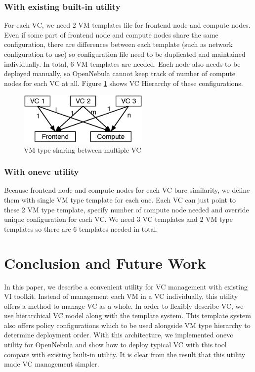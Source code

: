 \documentclass[conference]{IEEEtran}
\begin{document}
\subsubsection{With existing built-in utility}
For each VC, we need 2 VM templates file for frontend node and compute nodes.
Even if some part of frontend node and compute nodes share the same configuration, there are differences between each template (such as network configuration to use) so configuration file need to be duplicated and maintained individually.
In total, 6 VM templates are needed.
Each node also needs to be deployed manually, so OpenNebula cannot keep track of number of compute nodes for each VC at all.
Figure \ref{fig:vmtypeshare} shows VC Hierarchy of these configurations.

\begin{figure}[!t]
\centering
\includegraphics[width=2.5in]{vmtypeshare}
\caption{VM type sharing between multiple VC}
\label{fig:vmtypeshare}
\end{figure}

\subsubsection{With onevc utility}
Because frontend node and compute nodes for each VC bare similarity, we define them with single VM type template for each one.
Each VC can just point to these 2 VM type template, specify number of compute node needed and override unique configuration for each VC.
We need 3 VC templates and 2 VM type templates so there are 6 templates needed in total.

\section{Conclusion and Future Work}
In this paper, we describe a convenient utility for VC management with existing VI toolkit.
Instead of management each VM in a VC individually, this utility offers a method to manage VC as a whole.
In order to flexibly describe VC, we use hierarchical VC model along with the template system.
This template system also offers policy configurations which to be used alongside VM type hierarchy to determine deployment order.
With this architecture, we implemented onevc utility for OpenNebula and show how to deploy typical VC with this tool compare with existing built-in utility.
It is clear from the result that this utility made VC management simpler.
\end{document}

